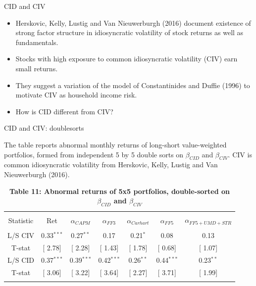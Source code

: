 \documentclass{beamer}
\begin{document}
\normalsize
\begin{frame}{CID and CIV}
\begin{itemize}
    \item {Herskovic, Kelly, Lustig and Van Nieuwerburgh (2016) document existence of strong factor structure in idiosyncratic volatility of stock returns as well as fundamentals.}
    \item {Stocks with high exposure to common idiosyncratic volatility (CIV) earn small returns.}
    \item {They suggest a variation of the model of Constantinides and Duffie (1996) to motivate CIV as household income risk.}
    \item {How is CID different from CIV?}
\end{itemize}

\end{frame}


\footnotesize
\begin{frame}{CID and CIV: doublesorts}
\begin{table}[!htbp] \centering 
  \caption*{\textbf{Table 11: Abnormal returns of 5x5 portfolios, double-sorted on $\beta_{CID}$ and $\beta_{CIV}$}}
  \label{} 
  \begin{flushleft}
    {\medskip \scriptsize
 The table reports abnormal monthly returns of long-short value-weighted portfolios, formed from independent 5 by 5 double sorts on $\beta_{CID}$ and $\beta_{CIV}$. CIV is common idiosyncratic volatility from Herskovic, Kelly, Lustig and Van Nieuwerburgh (2016). }
    \medskip
    \end{flushleft}
\begin{tabular}{@{\extracolsep{5pt}} ccccccc} 
\\[-1.8ex]\hline 
\hline \\[-1.8ex] 
Statistic & Ret & $\alpha_{CAPM}$ & $\alpha_{FF3}$ & $\alpha_{Carhart}$ & $\alpha_{FF5}$ & $\alpha_{FF5+UMD+STR}$ \\ 
\hline \\[-1.8ex] 
L/S CIV & 0.33$^{***}$ & 0.27$^{**}$ & 0.17 & 0.21$^{*}$ & 0.08 & 0.13 \\ 
T-stat & [ 2.78] & [ 2.28] & [ 1.43] & [ 1.78] & [ 0.68] & [ 1.07] \\ 
L/S CID & 0.37$^{***}$ & 0.39$^{***}$ & 0.42$^{***}$ & 0.26$^{**}$ & 0.44$^{***}$ & 0.23$^{**}$ \\ 
T-stat & [ 3.06] & [ 3.22] & [ 3.64] & [ 2.27] & [ 3.71] & [ 1.99] \\ 
\hline \\[-1.8ex] 
\end{tabular} 
\end{table}
\end{frame}
\end{document}
